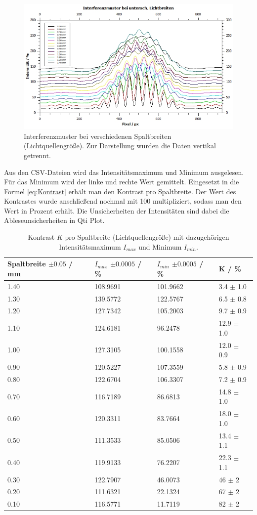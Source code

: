\documentclass[12pt,a4paper,twoside]{article}
\begin{document}
\begin{figure}[H]
    \centering
    \includegraphics[width=0.6\linewidth]{nudes/aufgabe 1 plot.jpg}
    \caption{Interferenzmuster bei verschiedenen Spaltbreiten (Lichtquellengröße). Zur Darstellung wurden die Daten vertikal getrennt. }
    \label{fig:aufgabe 1 plot}
\end{figure}

\noindent
Aus den CSV-Dateien wird das Intensitätsmaximum und Minimum ausgelesen. Für das Minimum wird der linke und rechte Wert gemittelt. Eingesetzt in die Formel \ref{eq:Kontrast} erhält man den Kontrast pro Spaltbreite. 
Der Wert des Kontrastes wurde anschließend nochmal mit 100 multipliziert, sodass man den Wert in Prozent erhält. 
Die Unsicherheiten der Intensitäten sind dabei die Ableseunsicherheiten in Qti Plot. 

\begin{table}[H]
    \centering
    \caption{Kontrast $K$ pro Spaltbreite (Lichtquellengröße) mit dazugehörigen Intensitätsmaximum $I_{max}$ und Minimum $I_{min}$.  }
    \label{tab:kontrast}
    \begin{tabular}{| l | l | l | l |}
        \hline
        Spaltbreite $\pm 0.05$ / mm & $I_{max}$ $\pm 0.0005 $ / \% & $I_{min}$ $\pm 0.0005$ / \% & K / \% \\
        \hline
        1.40 & 108.9691 & 101.9662  & 3.4   $\pm$ 1.0   \\
        1.30 & 139.5772 & 122.5767  & 6.5   $\pm$ 0.8   \\
        1.20 & 127.7342 & 105.2003  & 9.7   $\pm$ 0.9   \\
        1.10 & 124.6181 & 96.2478   & 12.9  $\pm$ 1.0   \\
        1.00 & 127.3105 & 100.1558  & 12.0  $\pm$ 0.9   \\
        0.90 & 120.5227 & 107.3559  & 5.8   $\pm$ 0.9   \\
        0.80 & 122.6704 & 106.3307  & 7.2   $\pm$ 0.9   \\
        0.70 & 116.7189 & 86.6813   & 14.8  $\pm$ 1.0   \\
        0.60 & 120.3311 & 83.7664   & 18.0  $\pm$ 1.0   \\
        0.50 & 111.3533 & 85.0506   & 13.4  $\pm$ 1.1   \\
        0.40 & 119.9133 & 76.2207   & 22.3  $\pm$ 1.1   \\
        0.30 & 122.7907 & 46.0073   & 46    $\pm$ 2     \\
        0.20 & 111.6321 & 22.1324   & 67    $\pm$ 2     \\
        0.10 & 116.5771 & 11.7119   & 82    $\pm$ 2     \\
        \hline
    \end{tabular}
\end{table}
\end{document}
